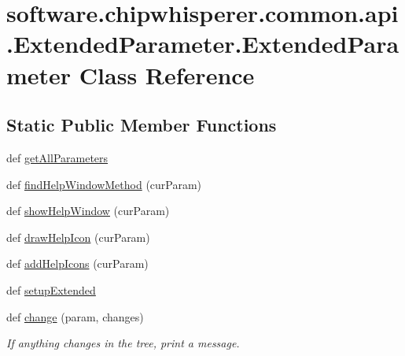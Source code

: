 \hypertarget{classsoftware_1_1chipwhisperer_1_1common_1_1api_1_1ExtendedParameter_1_1ExtendedParameter}{}\section{software.\+chipwhisperer.\+common.\+api.\+Extended\+Parameter.\+Extended\+Parameter Class Reference}
\label{classsoftware_1_1chipwhisperer_1_1common_1_1api_1_1ExtendedParameter_1_1ExtendedParameter}
\subsection*{Static Public Member Functions}
\begin{DoxyCompactItemize}
\item 
def \hyperlink{classsoftware_1_1chipwhisperer_1_1common_1_1api_1_1ExtendedParameter_1_1ExtendedParameter_a2ab4764a9cd83977273f8d8e76a4efb7}{get\+All\+Parameters}
\item 
def \hyperlink{classsoftware_1_1chipwhisperer_1_1common_1_1api_1_1ExtendedParameter_1_1ExtendedParameter_aad823165c339700ff83a6707c0c33c65}{find\+Help\+Window\+Method} (cur\+Param)
\item 
def \hyperlink{classsoftware_1_1chipwhisperer_1_1common_1_1api_1_1ExtendedParameter_1_1ExtendedParameter_a081497ebb71276b0ac24fb4811ca1dcc}{show\+Help\+Window} (cur\+Param)
\item 
def \hyperlink{classsoftware_1_1chipwhisperer_1_1common_1_1api_1_1ExtendedParameter_1_1ExtendedParameter_a820104612a421b9f641503261d5e8299}{draw\+Help\+Icon} (cur\+Param)
\item 
def \hyperlink{classsoftware_1_1chipwhisperer_1_1common_1_1api_1_1ExtendedParameter_1_1ExtendedParameter_af91e882fe94b8bd9e0532488a9a19d00}{add\+Help\+Icons} (cur\+Param)
\item 
def \hyperlink{classsoftware_1_1chipwhisperer_1_1common_1_1api_1_1ExtendedParameter_1_1ExtendedParameter_a78ea872d430d928ece118acfe32b9f59}{setup\+Extended}
\item 
def \hyperlink{classsoftware_1_1chipwhisperer_1_1common_1_1api_1_1ExtendedParameter_1_1ExtendedParameter_a1fdfcaabd393a61caaacd5409fec8fe6}{change} (param, changes)
\begin{DoxyCompactList}\small\item\em If anything changes in the tree, print a message. \end{DoxyCompactList}\item 

\end{DoxyCompactItemize}
